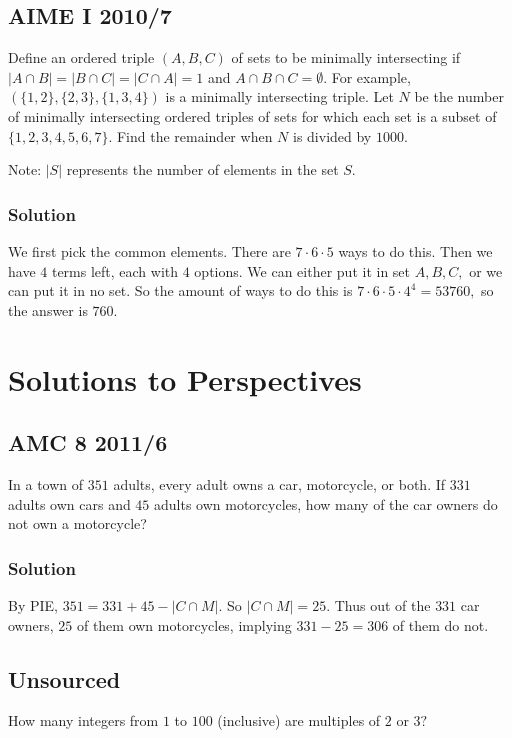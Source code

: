 \documentclass[blue,onecol]{shooting}
\begin{document}
\section{AIME I 2010/7}

Define an ordered triple $(A, B, C)$ of sets to be minimally intersecting if $|A \cap B| = |B \cap C| = |C \cap A| = 1$ and $ A \cap B \cap C = \emptyset$. For example, $(\{1,2\},\{2,3\},\{1,3,4\})$ is a minimally intersecting triple. Let $N$ be the number of minimally intersecting ordered triples of sets for which each set is a subset of $\{1,2,3,4,5,6,7\}$. Find the remainder when $N$ is divided by $1000$.

Note: $|S|$ represents the number of elements in the set $S.$

\subsection{Solution}
We first pick the common elements. There are $7\cdot 6\cdot 5$ ways to do this. Then we have $4$ terms left, each with $4$ options. We can either put it in set $A,B,C,$ or we can put it in no set. So the amount of ways to do this is $7\cdot 6\cdot 5\cdot 4^4=53760,$ so the answer is $760.$


\chapter{Solutions to Perspectives}












\section{AMC 8 2011/6}
In a town of $351$ adults, every adult owns a car, motorcycle, or both. If $331$ adults own cars and $45$ adults own motorcycles, how many of the car owners do not own a motorcycle?

\subsection{Solution}
By PIE, $351=331+45-|C \cap M|.$ So $|C\cap M|=25.$ Thus out of the $331$ car owners, $25$ of them own motorcycles, implying $331-25=306$ of them do not.

\section{Unsourced}
How many integers from $1$ to $100$ (inclusive) are multiples of $2$ or $3?$
\end{document}
